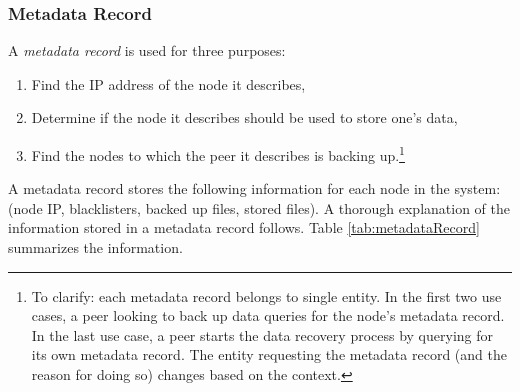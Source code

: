 \documentclass[12pt]{report}
\begin{document}
\subsubsection{Metadata Record} \label{subsubsec:MetadataRecord}

A \textit{metadata record} is used for three purposes:

\begin{enumerate}
  \item Find the IP address of the node it describes,
  \item Determine if the node it describes should be used to store one's data,
  \item Find the nodes to which the peer it describes is backing up.\footnote{To clarify: each metadata record belongs to single entity. In the first two use cases, a peer looking to back up data queries for the node's metadata record. In the last use case, a peer starts the data recovery process by querying for its own metadata record. The entity requesting the metadata record (and the reason for doing so) changes based on the context.}
\end{enumerate}

A metadata record stores the following information for each node in the system: (node IP, blacklisters, backed up files, stored files). A thorough explanation of the information stored in a metadata record follows. Table \ref{tab:metadataRecord} summarizes the information.
\end{document}
